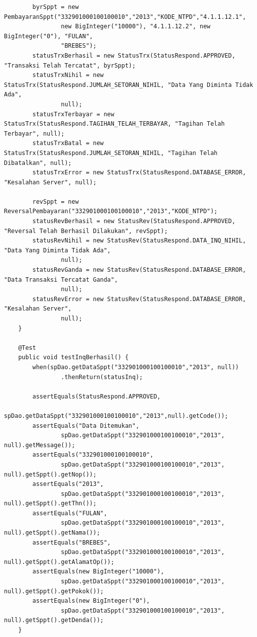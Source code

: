 \documentclass[pdftex,12pt, oneside]{article}
\begin{document}
\begin{enumerate}[A.]
\begin{enumerate}[1.]
\begin{lstlisting}
        byrSppt = new PembayaranSppt("332901000100100010","2013","KODE_NTPD","4.1.1.12.1",
                new BigInteger("10000"), "4.1.1.12.2", new BigInteger("0"), "FULAN",
                "BREBES");
        statusTrxBerhasil = new StatusTrx(StatusRespond.APPROVED, "Transaksi Telah Tercatat", byrSppt);
        statusTrxNihil = new StatusTrx(StatusRespond.JUMLAH_SETORAN_NIHIL, "Data Yang Diminta Tidak Ada",
                null);
        statusTrxTerbayar = new StatusTrx(StatusRespond.TAGIHAN_TELAH_TERBAYAR, "Tagihan Telah Terbayar", null);
        statusTrxBatal = new StatusTrx(StatusRespond.JUMLAH_SETORAN_NIHIL, "Tagihan Telah Dibatalkan", null);
        statusTrxError = new StatusTrx(StatusRespond.DATABASE_ERROR, "Kesalahan Server", null);

        revSppt = new ReversalPembayaran("332901000100100010","2013","KODE_NTPD");
        statusRevBerhasil = new StatusRev(StatusRespond.APPROVED, "Reversal Telah Berhasil Dilakukan", revSppt);
        statusRevNihil = new StatusRev(StatusRespond.DATA_INQ_NIHIL, "Data Yang Diminta Tidak Ada",
                null);
        statusRevGanda = new StatusRev(StatusRespond.DATABASE_ERROR, "Data Transaksi Tercatat Ganda",
                null);
        statusRevError = new StatusRev(StatusRespond.DATABASE_ERROR, "Kesalahan Server",
                null);
    }

    @Test
    public void testInqBerhasil() {
        when(spDao.getDataSppt("332901000100100010","2013", null))
                .thenReturn(statusInq);

        assertEquals(StatusRespond.APPROVED,
                spDao.getDataSppt("332901000100100010","2013",null).getCode());
        assertEquals("Data Ditemukan",
                spDao.getDataSppt("332901000100100010","2013", null).getMessage());
        assertEquals("332901000100100010",
                spDao.getDataSppt("332901000100100010","2013", null).getSppt().getNop());
        assertEquals("2013",
                spDao.getDataSppt("332901000100100010","2013", null).getSppt().getThn());
        assertEquals("FULAN",
                spDao.getDataSppt("332901000100100010","2013", null).getSppt().getNama());
        assertEquals("BREBES",
                spDao.getDataSppt("332901000100100010","2013", null).getSppt().getAlamatOp());
        assertEquals(new BigInteger("10000"),
                spDao.getDataSppt("332901000100100010","2013", null).getSppt().getPokok());
        assertEquals(new BigInteger("0"),
                spDao.getDataSppt("332901000100100010","2013", null).getSppt().getDenda());
    }


\end{lstlisting}
\end{enumerate}
\end{enumerate}
\end{document}
